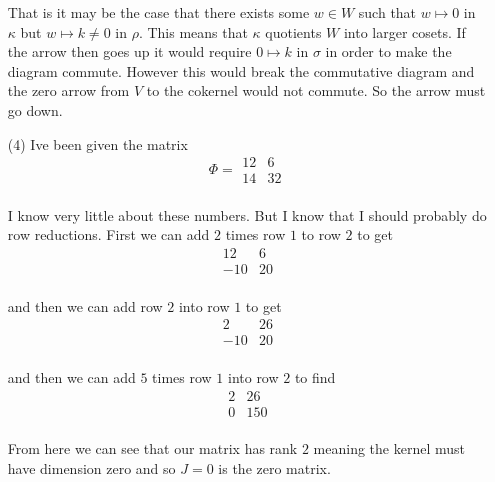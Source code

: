 \documentclass[12pt]{amsart}
\theoremstyle{definition}
\DeclareMathOperator{\image}{\mathrm{im}}
\newcommand{\se}{\subseteq}
\begin{document}
\begin{itemize}
That is it may be the case that there exists some $w\in W$ such that $w\mapsto 0$ in $\kappa$ but $w\mapsto k\neq 0$ in $\rho$. This means that $\kappa$ quotients $W$ into larger cosets. If the arrow then goes up it would require $0\mapsto k$ in $\sigma$ in order to make the diagram commute. However this would break the commutative diagram and the zero arrow from $V$ to the cokernel would not commute. So the arrow must go down.\\ %

\item[(4)] Ive been given the matrix 
\[
 \Phi=\boxed{\begin{matrix}
12 & 6 \\
14 & 32
\end{matrix}}
\]\\
I know very little about these numbers. But I know that I should probably do row reductions. First we can add $2$ times row $1$ to row $2$ to get
\[
 \boxed{\begin{matrix}
12 & 6 \\
-10 & 20
\end{matrix}}
\]\\

and then we can add row $2$ into row $1$ to get
\[
 \boxed{\begin{matrix}
2 & 26 \\
-10 & 20
\end{matrix}}
\]\\
and then we can add $5$ times row $1$ into row $2$ to find 
\[
 \boxed{\begin{matrix}
2 & 26 \\
0 & 150
\end{matrix}}
\]\\
From here we can see that our matrix has rank $2$ meaning the kernel must have dimension zero and so $J=0$ is the zero matrix.\\


\end{itemize}
\end{document}
